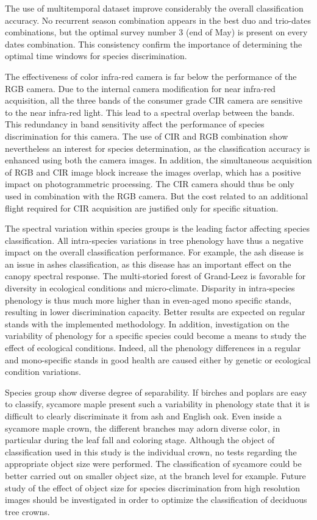 \documentclass[remotesensing,article,submit,moreauthors,pdftex,12pt,a4paper]{mdpi} %
\begin{document}
The use of multitemporal dataset improve considerably the overall classification accuracy. 
No recurrent season combination appears in the best duo and trio-dates combinations, but the optimal survey number 3 (end of May) is present on every dates combination.
This consistency confirm the importance of determining the optimal time windows for species discrimination.

The effectiveness of color infra-red camera is far below the performance of the RGB camera. 
Due to the internal camera modification for near infra-red acquisition, all the three bands of the consumer grade CIR camera are sensitive to the near infra-red light.
This lead to a spectral overlap between the bands. 
This redundancy in band sensitivity affect the performance of species discrimination for this camera. 
The use of CIR and RGB combination show nevertheless an interest for species determination, as the classification accuracy is enhanced using both the camera images.
In addition, the simultaneous acquisition of RGB and CIR image block increase the images overlap, which has a positive impact on photogrammetric processing.
The CIR camera should thus be only used in combination with the RGB camera.
But the cost related to an additional flight required for CIR acquisition are justified only for specific situation.

The spectral variation within species groups is the leading factor affecting species classification. 
All intra-species variations in tree phenology have thus a negative impact on the overall classification performance.
For example, the ash disease is an issue in ashes classification, as this disease has an important effect on the canopy spectral response.
The multi-storied forest of Grand-Leez is favorable for diversity in ecological conditions and micro-climate.
Disparity in intra-species phenology is thus much more higher than in even-aged mono specific stands, resulting in lower discrimination capacity.
Better results are expected on regular stands with the implemented methodology.
In addition, investigation on the variability of phenology for a specific species could become a means to study the effect of ecological conditions.
Indeed, all the phenology differences in a regular and mono-specific stands in good health are caused either by genetic or ecological condition variations.

Species group show diverse degree of separability.
If birches and poplars are easy to classify, sycamore maple present such a variability in phenology state that it is difficult to clearly discriminate it from ash and English oak.
Even inside a sycamore maple crown, the different branches may adorn diverse color, in particular during the leaf fall and coloring stage.
Although the object of classification used in this study is the individual crown, no tests regarding the appropriate object size were performed.
The classification of sycamore could be better carried out on smaller object size, at the branch level for example. 
Future study of the effect of object size for species discrimination from high resolution images should be investigated in order to optimize the classification of deciduous tree crowns.
\end{document}

